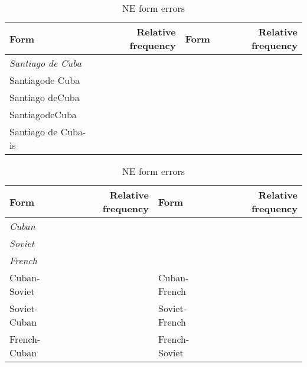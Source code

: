 \begin{table}
\centering
\caption{NE form errors}
\begin{tabular}{l r | l r }\toprule
 \textbf{Form} & \textbf{Relative frequency} & \textbf{Form} & \textbf{Relative frequency} \\
\midrule
\emph{Santiago de Cuba} & & & \\
\midrule
Santiagode Cuba & & & \\
Santiago deCuba & & & \\
SantiagodeCuba & & &\\
Santiago de Cuba-is & & &\\
\bottomrule
\end{tabular}
\end{table}

\begin{table}
\centering
\caption{NE form errors}
\begin{tabular}{l r | l r }\toprule
\textbf{Form} & \textbf{Relative frequency} & \textbf{Form} & \textbf{Relative frequency} \\
\midrule
\multicolumn{2}{l}{\emph{Cuban}} & \multicolumn{2}{r}{}\\
\multicolumn{2}{l}{\emph{Soviet}} & \multicolumn{2}{r}{}\\
\multicolumn{2}{l}{\emph{French}} & \multicolumn{2}{r}{}\\
\midrule
Cuban-Soviet & & Cuban-French & \\
Soviet-Cuban & & Soviet-French & \\
French-Cuban & & French-Soviet & \\
\bottomrule
\end{tabular}
\end{table}